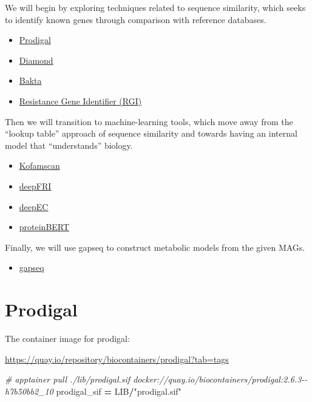\documentclass[
]{book}
\newenvironment{Shaded}{\begin{snugshade}}{\end{snugshade}}
\newcommand{\CommentTok}[1]{\textcolor[rgb]{0.56,0.35,0.01}{\textit{#1}}}
\newcommand{\NormalTok}[1]{#1}
\newcommand{\OperatorTok}[1]{\textcolor[rgb]{0.81,0.36,0.00}{\textbf{#1}}}
\newcommand{\StringTok}[1]{\textcolor[rgb]{0.31,0.60,0.02}{#1}}
\providecommand{\tightlist}{%
  \setlength{\itemsep}{0pt}\setlength{\parskip}{0pt}}
\begin{document}
We will begin by exploring techniques related to sequence similarity, which seeks to identify known genes through comparison with reference databases.

\begin{itemize}
\tightlist
\item
  \hyperref[prodigal]{Prodigal}
\item
  \hyperref[diamond]{Diamond}
\item
  \hyperref[bakta]{Bakta}
\item
  \hyperref[resistance-gene-identifier-rgi]{Resistance Gene Identifier (RGI)}
\end{itemize}

Then we will transition to machine-learning tools, which move away from the ``lookup table'' approach of sequence similarity and towards
having an internal model that ``understands'' biology.

\begin{itemize}
\tightlist
\item
  \hyperref[kofamscan]{Kofamscan}
\item
  \hyperref[deepfri]{deepFRI}
\item
  \hyperref[deepec]{deepEC}
\item
  \hyperref[proteinbert]{proteinBERT}
\end{itemize}

Finally, we will use gapseq to construct metabolic models from the given MAGs.

\begin{itemize}
\tightlist
\item
  \hyperref[gapseq]{gapseq}
\end{itemize}

\section{Prodigal}\label{prodigal}

The container image for prodigal:

\url{https://quay.io/repository/biocontainers/prodigal?tab=tags}

\begin{Shaded}
\begin{Highlighting}[numbers=left,,]
\CommentTok{\# apptainer pull ./lib/prodigal.sif docker://quay.io/biocontainers/prodigal:2.6.3{-}{-}h7b50bb2\_10}
\NormalTok{prodigal\_sif }\OperatorTok{=}\NormalTok{ LIB}\OperatorTok{/}\StringTok{"prodigal.sif"}
\end{Highlighting}
\end{Shaded}
\end{document}
